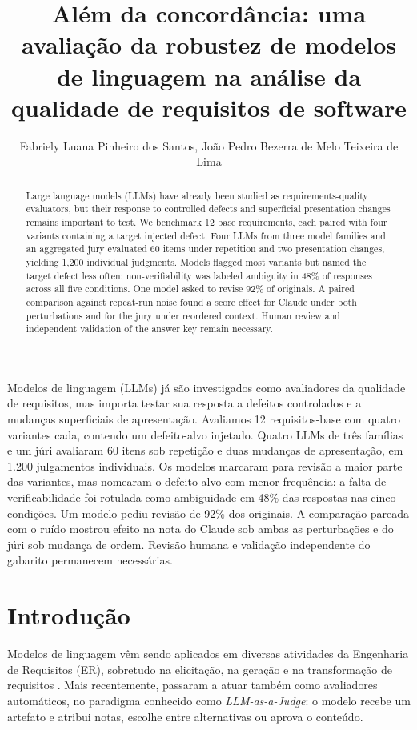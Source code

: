 \documentclass[12pt]{article}
\title{Além da concordância: uma avaliação da robustez de modelos de linguagem na análise da qualidade de requisitos de software}
\author{Fabriely Luana Pinheiro dos Santos, João Pedro Bezerra de Melo Teixeira de Lima}
\begin{document}
\maketitle

\begin{abstract}
Large language models (LLMs) have already been studied as requirements-quality evaluators, but their response to controlled defects and superficial presentation changes remains important to test. We benchmark 12 base requirements, each paired with four variants containing a target injected defect. Four LLMs from three model families and an aggregated jury evaluated 60 items under repetition and two presentation changes, yielding 1,200 individual judgments. Models flagged most variants but named the target defect less often: non-verifiability was labeled ambiguity in 48\% of responses across all five conditions. One model asked to revise 92\% of originals. A paired comparison against repeat-run noise found a score effect for Claude under both perturbations and for the jury under reordered context. Human review and independent validation of the answer key remain necessary.
\end{abstract}

\begin{resumo}
Modelos de linguagem (LLMs) já são investigados como avaliadores da qualidade de requisitos, mas importa testar sua resposta a defeitos controlados e a mudanças superficiais de apresentação. Avaliamos 12 requisitos-base com quatro variantes cada, contendo um defeito-alvo injetado. Quatro LLMs de três famílias e um júri avaliaram 60 itens sob repetição e duas mudanças de apresentação, em 1.200 julgamentos individuais. Os modelos marcaram para revisão a maior parte das variantes, mas nomearam o defeito-alvo com menor frequência: a falta de verificabilidade foi rotulada como ambiguidade em 48\% das respostas nas cinco condições. Um modelo pediu revisão de 92\% dos originais. A comparação pareada com o ruído mostrou efeito na nota do Claude sob ambas as perturbações e do júri sob mudança de ordem. Revisão humana e validação independente do gabarito permanecem necessárias.
\end{resumo}

\section{Introdução}

Modelos de linguagem vêm sendo aplicados em diversas atividades da Engenharia de Requisitos (ER), sobretudo na elicitação, na geração e na transformação de requisitos \citep{marques2024,silva2025}. Mais recentemente, passaram a atuar também como avaliadores automáticos, no paradigma conhecido como \emph{LLM-as-a-Judge}: o modelo recebe um artefato e atribui notas, escolhe entre alternativas ou aprova o conteúdo.
\end{document}
